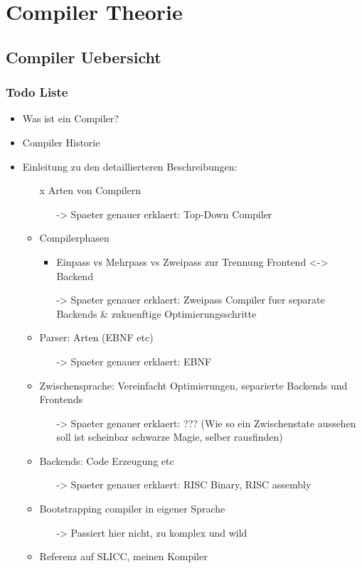 \part{Compiler Theorie}
\chapter{Compiler Uebersicht}
\label{chap:theory:compilerHistory}

\section{Todo Liste}

\begin{itemize}
  \item Was ist ein Compiler?
  \item Compiler Historie
  \item Einleitung zu den detaillierteren Beschreibungen:
  \begin{itemize}
    \item [x] Arten von Compilern 
    \begin{itemize}
    \item[->] Spaeter genauer erklaert: Top-Down Compiler
    \end{itemize}
    \item Compilerphasen
    \begin{itemize}
      \item Einpass vs Mehrpass vs Zweipass zur Trennung Frontend <-> Backend
      \item[->] Spaeter genauer erklaert: Zweipass Compiler fuer separate Backends \& zukuenftige Optimierungsschritte
    \end{itemize}
    \item Parser: Arten (EBNF etc)
    \begin{itemize}
    \item[->] Spaeter genauer erklaert: EBNF
    \end{itemize}
    \item Zwischensprache: Vereinfacht Optimierungen, separierte Backends und Frontends
    \begin{itemize}
      \item[->] Spaeter genauer erklaert: ??? (Wie so ein Zwischenstate aussehen soll ist scheinbar schwarze Magie, selber rausfinden)
    \end{itemize}
    \item Backends: Code Erzeugung etc
    \begin{itemize}
      \item[->] Spaeter genauer erklaert: RISC Binary, RISC assembly
    \end{itemize}
    \item Bootstrapping compiler in eigener Sprache
    \begin{itemize}
      \item[->] Passiert hier nicht, zu komplex und wild
    \end{itemize}
    \item Referenz auf SLICC, meinen Kompiler
  \end{itemize}
\end{itemize}


